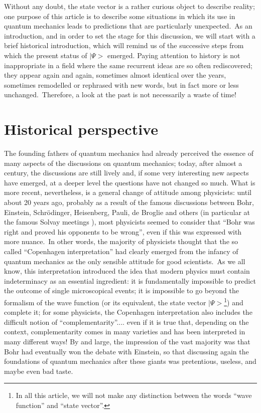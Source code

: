 \documentclass[12pt,onecolumn]{article}%
\begin{document}
Without any doubt, the state vector is a rather curious object to describe
reality; one purpose of this article is to describe some situations in which
its use in quantum mechanics leads to predictions that are particularly
unexpected.\ As an introduction, and in order to set the stage for this
discussion, we will start with a brief historical introduction, which will
remind us of the successive steps from which the present status of $\mid\Psi>$
emerged. Paying attention to history is not inappropriate in a field where the
same recurrent ideas are so often rediscovered; they appear again and again,
sometimes almost identical over the years, sometimes remodelled or rephrased
with new words, but in fact more or less unchanged.\ Therefore, a look at the
past is not necessarily a waste of time!

\section{Historical perspective}

\label{historical}

The founding fathers of quantum mechanics had already perceived the essence of
many aspects of the discussions on quantum mechanics; today, after almost a
century, the discussions are still lively and, if some very interesting new
aspects have emerged, at a deeper level the questions have not changed so
much. What is more recent, nevertheless, is a general change of attitude among
physicists: until about 20 years ago, probably as a result of the famous
discussions between Bohr, Einstein, Schr\"{o}dinger, Heisenberg, Pauli, de
Broglie and others (in particular at the famous Solvay meetings \cite{Bohr}),
most physicists seemed to consider that ``Bohr was right and proved his
opponents to be wrong'', even if this was expressed with more nuance.\ In
other words, the majority of physicists thought that the so called
``Copenhagen interpretation'' had clearly emerged from the infancy of quantum
mechanics as the only sensible attitude for good scientists.\ As we all know,
this interpretation introduced the idea that modern physics must contain
indeterminacy as an essential ingredient: it is fundamentally impossible to
predict the outcome of single microscopical events; it is impossible to go
beyond the formalism of the wave function (or its equivalent, the state vector
$\mid\Psi>$\footnote{In all this article, we will not make any distinction
between the words ``wave function'' and ``state vector''.}) and complete it;
for some physicists, the Copenhagen interpretation also includes the difficult
notion of ``complementarity''.... even if it is true that, depending on the
context, complementarity comes in many varieties and has been interpreted in
many different ways! By and large, the impression of the vast majority was
that Bohr had eventually won the debate with Einstein, so that discussing
again the foundations of quantum mechanics after these giants was pretentious,
useless, and maybe even bad taste.
\end{document}
